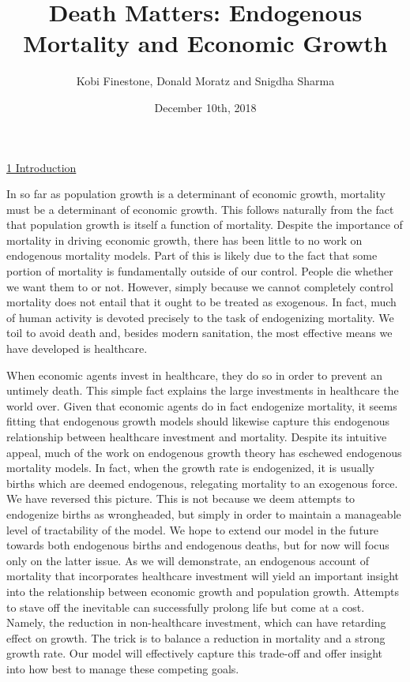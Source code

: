 \documentclass[12pt]{article}%
\begin{document}
\title{Death Matters: Endogenous Mortality and Economic Growth}
\author{Kobi Finestone, Donald Moratz and Snigdha Sharma}
\date{December 10th, 2018}
\maketitle

\underline{1 Introduction}

	In so far as population growth is a determinant of economic growth, mortality must be a determinant of economic growth. This follows naturally from the fact that population growth is itself a function of mortality. Despite the importance of mortality in driving economic growth, there has been little to no work on endogenous mortality models. Part of this is likely due to the fact that some portion of mortality is fundamentally outside of our control. People die whether we want them to or not. However, simply because we cannot completely control mortality does not entail that it ought to be treated as exogenous. In fact, much of human activity is devoted precisely to the task of endogenizing mortality. We toil to avoid death and, besides modern sanitation, the most effective means we have developed is healthcare. 

	When economic agents invest in healthcare, they do so in order to prevent an untimely death. This simple fact explains the large investments in healthcare the world over. Given that economic agents do in fact endogenize mortality, it seems fitting that endogenous growth models should likewise capture this endogenous relationship between healthcare investment and mortality. Despite its intuitive appeal, much of the work on endogenous growth theory has eschewed endogenous mortality models. In fact, when the growth rate is endogenized, it is usually births which are deemed endogenous, relegating mortality to an exogenous force. We have reversed this picture. This is not because we deem attempts to endogenize births as wrongheaded, but simply in order to maintain a manageable level of tractability of the model. We hope to extend our model in the future towards both endogenous births and endogenous deaths, but for now will focus only on the latter issue. As we will demonstrate, an endogenous account of mortality that incorporates healthcare investment will yield an important insight into the relationship between economic growth and population growth. Attempts to stave off the inevitable can successfully prolong life but come at a cost. Namely, the reduction in non-healthcare investment, which can have retarding effect on growth. The trick is to balance a reduction in mortality and a strong growth rate. Our model will effectively capture this trade-off and offer insight into how best to manage these competing goals. 
\end{document}
